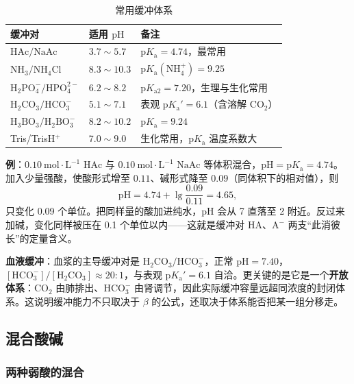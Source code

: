 \documentclass[UTF8]{ctexbook}
\begin{document}
\begin{table}[H]
\centering
\caption{常用缓冲体系}
\begin{tabular}{p{4.4cm}p{2.4cm}p{7.4cm}}
\toprule
缓冲对 & 适用 $\mathrm{pH}$ & 备注 \\
\midrule
$\mathrm{HAc/NaAc}$ & $3.7\sim5.7$ & $\mathrm{p}K_{\mathrm{a}}=4.74$，最常用 \\
$\mathrm{NH_3/NH_4Cl}$ & $8.3\sim10.3$ & $\mathrm{p}K_{\mathrm{a}}(\mathrm{NH_4^+})=9.25$ \\
$\mathrm{H_2PO_4^-/HPO_4^{2-}}$ & $6.2\sim8.2$ & $\mathrm{p}K_{\mathrm{a2}}=7.20$，生理与生化常用 \\
$\mathrm{H_2CO_3/HCO_3^-}$ & $5.1\sim7.1$ & 表观 $\mathrm{p}K_{\mathrm{a}}'=6.1$（含溶解 $\mathrm{CO_2}$） \\
$\mathrm{H_3BO_3/H_2BO_3^-}$ & $8.2\sim10.2$ & $\mathrm{p}K_{\mathrm{a}}=9.24$ \\
Tris/TrisH$^+$ & $7.0\sim9.0$ & 生化常用，$\mathrm{p}K_{\mathrm{a}}$ 温度系数大 \\
\bottomrule
\end{tabular}
\end{table}

\textbf{例}：$0.10\ \mathrm{mol\cdot L^{-1}}$ $\mathrm{HAc}$ 与 $0.10\ \mathrm{mol\cdot L^{-1}}$ $\mathrm{NaAc}$ 等体积混合，$\mathrm{pH}=\mathrm{p}K_{\mathrm{a}}=4.74$。加入少量强酸，使酸形式增至 $0.11$、碱形式降至 $0.09$（同体积下的相对值），则
\[
\mathrm{pH}=4.74+\lg\frac{0.09}{0.11}=4.65,
\]
只变化 0.09 个单位。把同样量的酸加进纯水，$\mathrm{pH}$ 会从 7 直落至 2 附近。反过来加碱，变化同样被压在 0.1 个单位以内——这就是缓冲对 $\mathrm{HA}$、$\mathrm{A^-}$ 两支“此消彼长”的定量含义。

\textbf{血液缓冲}：血浆的主导缓冲对是 $\mathrm{H_2CO_3/HCO_3^-}$，正常 $\mathrm{pH}=7.40$，$[\mathrm{HCO_3^-}]/[\mathrm{H_2CO_3}]\approx20:1$，与表观 $\mathrm{p}K_{\mathrm{a}}'=6.1$ 自洽。更关键的是它是一个\textbf{开放体系}：$\mathrm{CO_2}$ 由肺排出、$\mathrm{HCO_3^-}$ 由肾调节，因此实际缓冲容量远超同浓度的封闭体系。这说明缓冲能力不只取决于 $\beta$ 的公式，还取决于体系能否把某一组分移走。

\subsection{混合酸碱}

\subsubsection{两种弱酸的混合}
\end{document}
